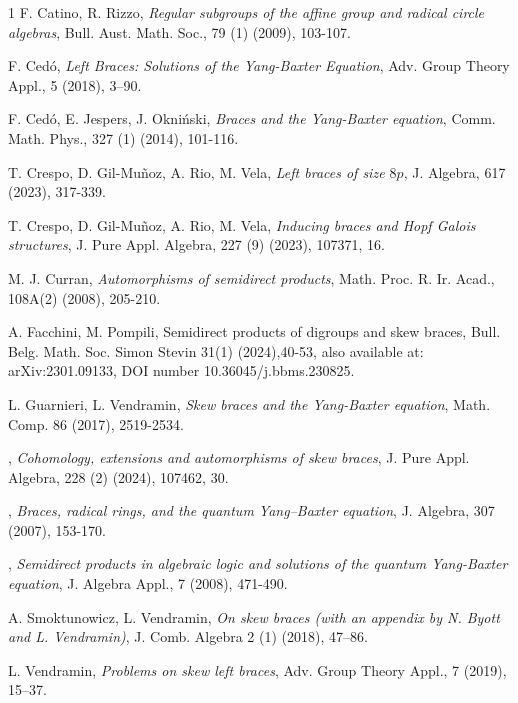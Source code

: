 \documentclass[12pt]{article}
\theoremstyle{definition}
\begin{document}
\begin{thebibliography}{1}
 F. Catino, R. Rizzo, \emph{Regular subgroups of 
the affine group and radical circle algebras}, Bull. Aust. Math. Soc., 79 (1) (2009), 103-107.
    
 F. Ced\'o,	\emph{Left Braces: Solutions of the Yang-Baxter Equation}, Adv. Group Theory Appl., 5 (2018), 3–90.

 F. Ced\'o, E. Jespers, J. Okni\'nski, \emph{Braces and the Yang-Baxter equation}, Comm. Math. Phys., 327 (1) (2014), 101-116.
	
 T. Crespo, D. Gil-Mu\~noz, A. Rio, M. Vela, \emph{Left braces of size $8p$}, J. Algebra, 617 (2023), 317-339.
	
 T. Crespo, D. Gil-Mu\~noz, A. Rio, M. Vela, \emph{Inducing braces and Hopf Galois structures},  J. Pure Appl. Algebra, 227 (9) (2023), 107371, 16.
	
 M. J. Curran, \emph{Automorphisms of semidirect products}, Math. Proc. R. Ir. Acad., 108A(2) (2008),  205-210.
	
 A. Facchini,  M. Pompili, Semidirect products of digroups and skew braces, Bull. Belg. Math. Soc. Simon Stevin 31(1) (2024),40-53, also available at: arXiv:2301.09133, DOI number 10.36045/j.bbms.230825.
	
 L. Guarnieri, L. Vendramin, \emph{Skew braces and the Yang-Baxter equation}, Math. Comp. 86 (2017), 2519-2534.

, \emph{Cohomology, extensions and automorphisms of skew braces}, J. Pure Appl. Algebra, 228 (2) (2024), 107462, 30.
	
, \emph{Braces, radical rings, and the quantum Yang–Baxter equation}, J. Algebra, 307 (2007), 153-170.
 
, \emph{Semidirect products in algebraic logic and solutions of the quantum Yang-Baxter equation}, J. Algebra Appl., 7 (2008), 471-490.
	
 A. Smoktunowicz, L. Vendramin, \emph{On skew braces (with an appendix by N. Byott and L. Vendramin)}, J. Comb. Algebra 2  (1) (2018),  47–86.
	
 L. Vendramin, \emph{Problems on skew left braces}, Adv. Group Theory Appl., 7 (2019), 15–37.
	
\end{thebibliography}
\end{document}
